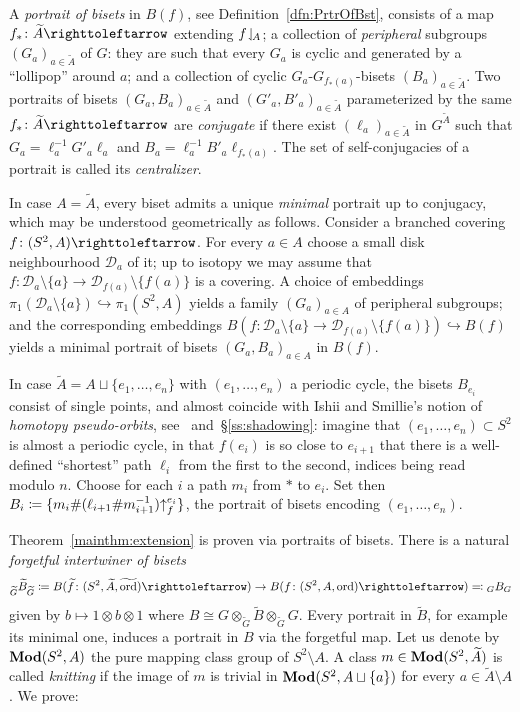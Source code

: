\documentclass{amsart}
\newcommand\wtf{{\widetilde f}}
\newcommand\wtA{{\widetilde A}}
\newcommand\wtB{{\widetilde B}}
\newcommand\wtG{{\widetilde G}}
\newcommand\wtord{{\widetilde\ord}}
\begin{document}
A \emph{portrait of bisets} in $B(f)$, see
Definition~\ref{dfn:PrtrOfBst}, consists of a map
$f_*\colon\wtA\selfmap$ extending $f\!\downharpoonleft_{\!A}$; a collection of
\emph{peripheral} subgroups $(G_a)_{a\in\wtA}$ of $G$: they
are such that every $G_a$ is cyclic and generated by a ``lollipop''
around $a$; and a collection of cyclic $G_a$-$G_{f_*(a)}$-bisets
$(B_a)_{a\in\wtA}$.  Two portraits of bisets
$(G_a,B_a)_{a\in\wtA}$ and $(G'_a,B'_a)_{a\in\wtA}$
parameterized by the same $f_*\colon\wtA\selfmap$ are
\emph{conjugate} if there exist $(\ell_a)_{a\in\wtA}$ in $G^\wtA$
such that $G_a=\ell_a^{-1}G'_a\ell_a$ and
$B_a=\ell_a^{-1}B'_a\ell_{f_*(a)}$. The set of self-conjugacies of a
portrait is called its \emph{centralizer}.

In case $A=\wtA$, every biset admits a unique \emph{minimal}
portrait up to conjugacy, which may be understood geometrically as
follows. Consider a branched covering $f\colon (S^2,A)\selfmap$. For
every $a\in A$ choose a small disk neighbourhood $\mathcal D_a$ of it; up
to isotopy we may assume that
$f\colon \mathcal D_a \setminus\{a\}\to\mathcal D_{f(a)} \setminus\{f(a)\}$ is a
covering. A choice of embeddings
$\pi_1(\mathcal D_a\setminus\{a\})\hookrightarrow\pi_1(S^2,A)$ yields a family
$(G_a)_{a\in A}$ of peripheral subgroups; and the corresponding
embeddings
$B(f\colon \mathcal D_a\setminus\{a\} \to\mathcal D_{f(a)}\setminus
\{f(a)\})\hookrightarrow B(f)$ yields a minimal portrait of bisets
$(G_a,B_a)_{a\in A}$ in $B(f)$.

In case $\wtA=A\sqcup\{e_1,\dots,e_n\}$ with $(e_1,\dots,e_n)$
a periodic cycle, the bisets $B_{e_i}$ consist of single points, and
almost coincide with Ishii and Smillie's notion of \emph{homotopy
  pseudo-orbits}, see~\cite{ishii-smillie:shadowing}
and~\S\ref{ss:shadowing}: imagine that $(e_1,\dots,e_n)\subset S^2$ is
almost a periodic cycle, in that $f(e_i)$ is so close to $e_{i+1}$
that there is a well-defined ``shortest'' path $\ell_i$ from the first
to the second, indices being read modulo $n$. Choose for each $i$ a
path $m_i$ from $*$ to $e_i$. Set then
$B_i\coloneqq\{m_i\#(\ell_{i+1}\#m_{i+1}^{-1}){\uparrow}_{f}^{e_i}\}$, the
portrait of bisets encoding $(e_1,\dots,e_n)$.

Theorem~\ref{mainthm:extension} is proven via portraits of bisets. There
is a natural \emph{forgetful intertwiner of bisets}
\begin{equation}\label{eq:forgetinter}
  \subscript{\wtG}{\wtB}_{\wtG} \coloneqq B(\wtf\colon(S^2,\wtA,\wtord)\selfmap )\to B(f\colon(S^2,A,\ord)\selfmap)\eqqcolon \subscript G B_G
\end{equation}
given by $b\mapsto1\otimes b\otimes 1$ where
$B\cong G\otimes_{\wtG}\wtB\otimes_\wtG G$. Every portrait in $\wtB$,
for example its minimal one, induces a portrait in $B$ via the
forgetful map. Let us denote by $\mathbf{\relax Mod}(S^2,A)$ the pure mapping class
group of $S^2\setminus A$. A class $m\in \Mod(S^2,\wtA)$ is called
\emph{knitting} if the image of $m$ is trivial in
$\mathbf{\relax Mod}(S^2,A\sqcup \{a\})$ for every $a\in\wtA\setminus A$. We prove:
\end{document}
